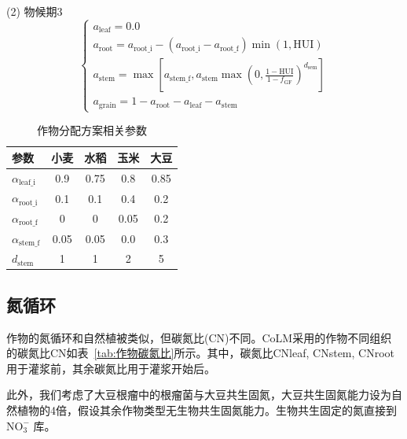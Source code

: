 (2)	物候期3 \\
\begin{equation}
  \left\{\begin{array}{c}
      a_{\mathrm{leaf}}=0.0 \\
      a_{\mathrm{root}}=a_{\mathrm{root\_i}}-\left(a_{\mathrm{root\_i}}-a_{\mathrm{root\_f}}\right) \min(1, {\mathrm {HUI}}) \\
      a_{\mathrm{stem}}=\max \left[a_{\mathrm{stem\_f}}, a_{\mathrm{stem}} \max \left(0, \frac{1-{\mathrm {HUI}}}{1-f_{\mathrm{GF}}}\right)^{d_{\mathrm{sem}}}\right] \\
      a_{\mathrm{grain}}=1-a_{\mathrm{root}}-a_{\mathrm{leaf}}-a_{\mathrm{stem}}
  \end{array}\right.
\end{equation}
\begin{table}[htbp]
  \centering
  \caption{作物分配方案相关参数}
  \label{tab:作物分配方案相关参数}
  \begin{tabular}{@{}lcccc@{}}
    \toprule
    参数                        & 小麦 & 水稻 & 玉米 & 大豆 \\ \midrule
    $\alpha_{\mathrm{leaf\_i}}$ & 0.9  & 0.75 & 0.8  & 0.85 \\
    $\alpha_{\mathrm{root\_i}}$ & 0.1  & 0.1  & 0.4  & 0.2  \\
    $\alpha_{\mathrm{root\_f}}$ & 0    & 0    & 0.05 & 0.2  \\
    $\alpha_{\mathrm{stem\_f}}$ & 0.05 & 0.05 & 0.0  & 0.3  \\
    $d_{\mathrm{stem}}$         & 1    & 1    & 2    & 5    \\ \bottomrule
  \end{tabular}
\end{table}

\subsection{氮循环}
作物的氮循环和自然植被类似，但碳氮比(CN)不同。CoLM采用的作物不同组织的碳氮比CN如表~\ref{tab:作物碳氮比}所示。其中，碳氮比CNleaf, CNstem, CNroot用于灌浆前，其余碳氮比用于灌浆开始后。

此外，我们考虑了大豆根瘤中的根瘤菌与大豆共生固氮，大豆共生固氮能力设为自然植物的4倍，假设其余作物类型无生物共生固氮能力。生物共生固定的氮直接到 $\mathrm{NO_3^-}$ 库。


